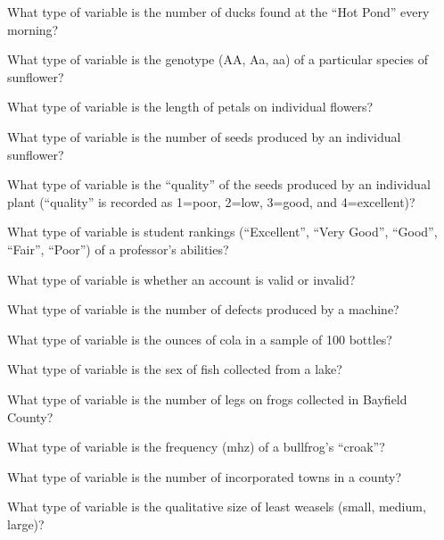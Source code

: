 \documentclass[10pt,openany]{book}\usepackage[]{graphicx}\usepackage[]{color}
\begin{document}
\begin{exsection}
  \item \label{revex:VarTypeDucks} What type of variable is the number of ducks found at the ``Hot Pond'' every morning? 
  \item \label{revex:VarTypeGenetics} What type of variable is the genotype (AA, Aa, aa) of a particular species of sunflower? 
  \item \label{revex:VarTypeGenetics2} What type of variable is the length of petals on individual flowers? 
  \item \label{revex:VarTypeGenetics3} What type of variable is the number of seeds produced by an individual sunflower? 
  \item \label{revex:VarTypeGenetics4} What type of variable is the ``quality'' of the seeds produced by an individual plant (``quality'' is recorded as 1=poor, 2=low, 3=good, and 4=excellent)? 
  \item \label{revex:VarTypeSOS} What type of variable is student rankings (``Excellent'', ``Very Good'', ``Good'', ``Fair'', ``Poor'') of a professor's abilities? 
  \item \label{revex:VarTypeAudit} What type of variable is whether an account is valid or invalid? 
  \item \label{revex:VarTypeDefects} What type of variable is the number of defects produced by a machine? 
  \item \label{revex:VarTypeBottles} What type of variable is the ounces of cola in a sample of 100 bottles? 
  \item \label{revex:VarTypeFish} What type of variable is the sex of fish collected from a lake? 
  \item \label{revex:VarTypeFrogs} What type of variable is the number of legs on frogs collected in Bayfield County? 
  \item \label{revex:VarTypeCroak} What type of variable is the frequency (mhz) of a bullfrog's ``croak''? 
  \item \label{revex:VarTypeTowns} What type of variable is the number of incorporated towns in a county? 
  \item \label{revex:VarTypeWeasels} What type of variable is the qualitative size of least weasels (small, medium, large)? 
\end{exsection}
\end{document}
